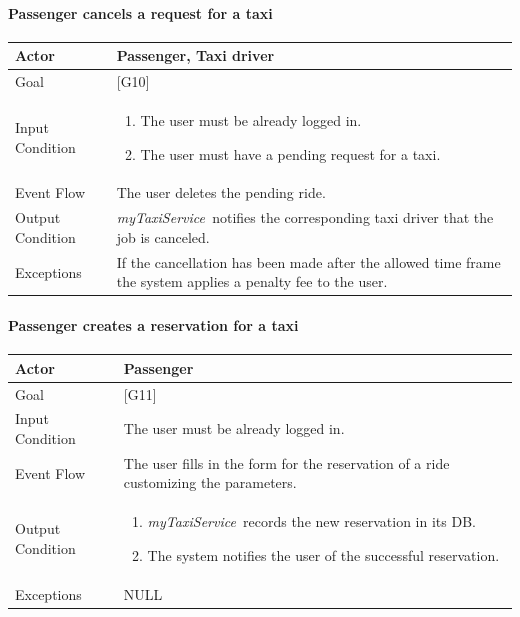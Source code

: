 \documentclass[a4paper,11pt]{report} %
\newcommand{\mts}{\mbox{\normalfont\itshape myTaxiService\ }}
\begin{document}
	\pagebreak
	
	\paragraph{Passenger cancels a request for a taxi}
	\begin{center}
		\begin{tabular}{| l | p{9cm} |}\hline
			Actor & Passenger, Taxi driver\\\hline
			Goal & {[}G10{]} \\\hline
			Input Condition & \begin{enumerate}
								\item The user must be already logged in.
								\item The user must have a pending request for a taxi.
						   	  \end{enumerate} \\\hline
			Event Flow & The user deletes the pending ride.\\\hline
			Output Condition & \mts notifies the corresponding taxi driver that the job is canceled.\\\hline
			Exceptions & If the cancellation has been made after the allowed time frame the system applies a penalty fee to the user.\\\hline
		\end{tabular}
	\end{center}
	
	\pagebreak
	
	\paragraph{Passenger creates a reservation for a taxi}
	\begin{center}
		\begin{tabular}{| l | p{9cm} |}\hline
			Actor & Passenger\\\hline
			Goal & {[}G11{]} \\\hline
			Input Condition & The user must be already logged in.\\\hline
			Event Flow & The user fills in the form for the reservation of a ride customizing the parameters.\\\hline
			Output Condition & \begin{enumerate}
									\item \mts records the new reservation in its DB.
									\item The system notifies the user of the successful reservation.
							   \end{enumerate}\\\hline
			Exceptions & NULL\\\hline
		\end{tabular}
	\end{center}
	
\end{document}
